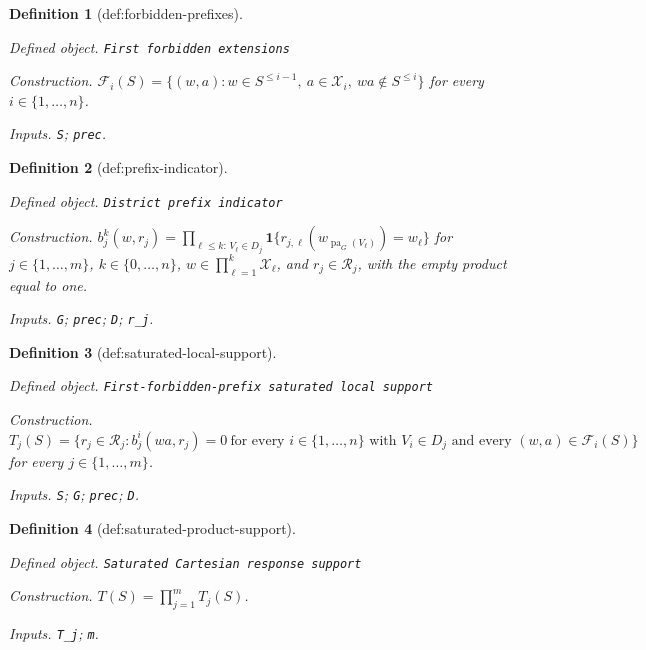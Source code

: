 \documentclass{article}
\newtheorem{definition}{Definition}
\begin{document}
\begin{definition}[def:forbidden-prefixes]\label{def:forbidden-prefixes}
\par\smallskip\noindent\emph{Defined object.} \texttt{First forbidden extensions}
\par\smallskip\noindent\emph{Construction.} \(\mathcal F_i(S)=\{(w,a):w\in S^{\le i-1},\ a\in\mathcal X_i,\ wa\notin S^{\le i}\}\) for every \(i\in\{1,\ldots,n\}\).
\par\smallskip\noindent\emph{Inputs.} \texttt{S}; \texttt{prec}.
\end{definition}

\begin{definition}[def:prefix-indicator]\label{def:prefix-indicator}
\par\smallskip\noindent\emph{Defined object.} \texttt{District prefix indicator}
\par\smallskip\noindent\emph{Construction.} \(b_j^k(w,r_j)=\prod_{\ell\le k:\,V_\ell\in D_j}\mathbf 1\{r_{j,\ell}(w_{\operatorname{pa}_G(V_\ell)})=w_\ell\}\) for \(j\in\{1,\ldots,m\}\), \(k\in\{0,\ldots,n\}\), \(w\in\prod_{\ell=1}^k\mathcal X_\ell\), and \(r_j\in\mathcal R_j\), with the empty product equal to one.
\par\smallskip\noindent\emph{Inputs.} \texttt{G}; \texttt{prec}; \texttt{D}; \texttt{r\_\allowbreak{}j}.
\end{definition}

\begin{definition}[def:saturated-local-support]\label{def:saturated-local-support}
\par\smallskip\noindent\emph{Defined object.} \texttt{First-\allowbreak{}forbidden-\allowbreak{}prefix saturated local support}
\par\smallskip\noindent\emph{Construction.} \(T_j(S)=\{r_j\in\mathcal R_j:b_j^i(wa,r_j)=0\ \text{for every }i\in\{1,\ldots,n\}\text{ with }V_i\in D_j\text{ and every }(w,a)\in\mathcal F_i(S)\}\) for every \(j\in\{1,\ldots,m\}\).
\par\smallskip\noindent\emph{Inputs.} \texttt{S}; \texttt{G}; \texttt{prec}; \texttt{D}.
\end{definition}

\begin{definition}[def:saturated-product-support]\label{def:saturated-product-support}
\par\smallskip\noindent\emph{Defined object.} \texttt{Saturated Cartesian response support}
\par\smallskip\noindent\emph{Construction.} \(T(S)=\prod_{j=1}^mT_j(S)\).
\par\smallskip\noindent\emph{Inputs.} \texttt{T\_\allowbreak{}j}; \texttt{m}.
\end{definition}
\end{document}
